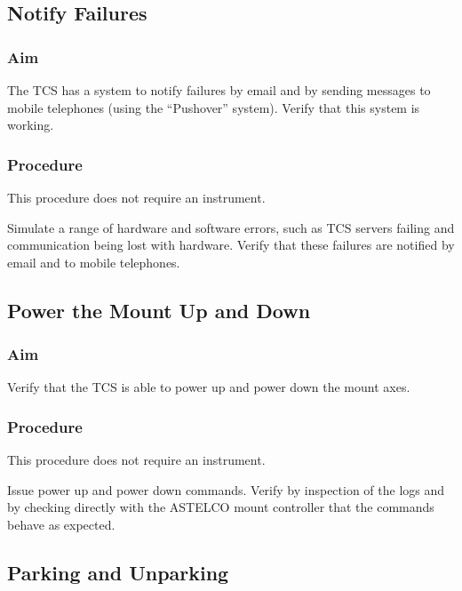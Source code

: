\documentclass{article}
\begin{document}
\subsection{Notify Failures}

\subsubsection{Aim}

The TCS has a system to notify failures by email and by sending messages to mobile telephones (using the “Pushover” system). Verify that this system is working.

\subsubsection{Procedure}

This procedure does not require an instrument.

Simulate a range of hardware and software errors, such as TCS servers failing and communication being lost with hardware. Verify that these failures are notified by email and to mobile telephones.


\subsection{Power the Mount Up and Down}

\subsubsection{Aim}

Verify that the TCS is able to power up and power down the mount axes.

\subsubsection{Procedure}

This procedure does not require an instrument.

Issue power up and power down commands. Verify by inspection of the logs and by checking directly with the ASTELCO mount controller that the commands behave as expected.


\subsection{Parking and Unparking}
\end{document}
